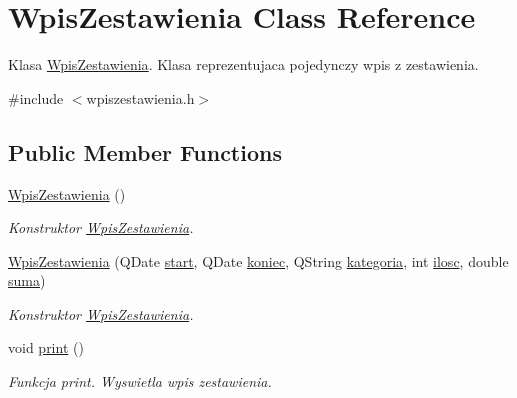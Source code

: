 \hypertarget{class_wpis_zestawienia}{}\section{Wpis\+Zestawienia Class Reference}
\label{class_wpis_zestawienia}


Klasa \hyperlink{class_wpis_zestawienia}{Wpis\+Zestawienia}. Klasa reprezentujaca pojedynczy wpis z zestawienia.  




{\ttfamily \#include $<$wpiszestawienia.\+h$>$}

\subsection*{Public Member Functions}
\begin{DoxyCompactItemize}
\item 
\hypertarget{class_wpis_zestawienia_a2c7a512d73c0b2ea7aefea06e273b546}{}\hyperlink{class_wpis_zestawienia_a2c7a512d73c0b2ea7aefea06e273b546}{Wpis\+Zestawienia} ()\label{class_wpis_zestawienia_a2c7a512d73c0b2ea7aefea06e273b546}

\begin{DoxyCompactList}\small\item\em Konstruktor \hyperlink{class_wpis_zestawienia}{Wpis\+Zestawienia}. \end{DoxyCompactList}\item 
\hyperlink{class_wpis_zestawienia_aff55225999605924177b3c2f5000ff86}{Wpis\+Zestawienia} (Q\+Date \hyperlink{class_wpis_zestawienia_a5d457906aef5d46dc6ee4744a1851cb3}{start}, Q\+Date \hyperlink{class_wpis_zestawienia_a3575567bd1069656acc3a39b193d7500}{koniec}, Q\+String \hyperlink{class_wpis_zestawienia_a286d6a98e6b41c38e6891bf71a474f47}{kategoria}, int \hyperlink{class_wpis_zestawienia_af8437e93134f18328e37e2fe05b3c7f5}{ilosc}, double \hyperlink{class_wpis_zestawienia_a3128b0bac6d69ea0db7ccc200adc6188}{suma})
\begin{DoxyCompactList}\small\item\em Konstruktor \hyperlink{class_wpis_zestawienia}{Wpis\+Zestawienia}. \end{DoxyCompactList}\item 
\hypertarget{class_wpis_zestawienia_a39c99052b33bffbd6dc07e425dd19a76}{}void \hyperlink{class_wpis_zestawienia_a39c99052b33bffbd6dc07e425dd19a76}{print} ()\label{class_wpis_zestawienia_a39c99052b33bffbd6dc07e425dd19a76}

\begin{DoxyCompactList}\small\item\em Funkcja print. Wyswietla wpis zestawienia. \end{DoxyCompactList}\end{DoxyCompactItemize}

